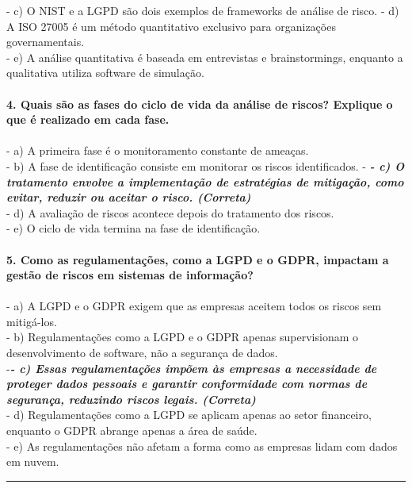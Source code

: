 \documentclass[12pt,oneside,a4paper,article]{abntex2}
\begin{document}
   - c) O NIST e a LGPD são dois exemplos de frameworks de análise de risco.
   - d) A ISO 27005 é um método quantitativo exclusivo para organizações governamentais.\\
   - e) A análise quantitativa é baseada em entrevistas e brainstormings, enquanto a qualitativa utiliza software de simulação.\\
\\
\textbf{4. Quais são as fases do ciclo de vida da análise de riscos? Explique o que é realizado em cada fase.}\\\\
   - a) A primeira fase é o monitoramento constante de ameaças.\\
   - b) A fase de identificação consiste em monitorar os riscos identificados. 
  -\textit{\textbf{ - c) O tratamento envolve a implementação de estratégias de mitigação, como evitar, reduzir ou aceitar o risco. (Correta)}}\\
   - d) A avaliação de riscos acontece depois do tratamento dos riscos.\\
   - e) O ciclo de vida termina na fase de identificação.\\
\\
\textbf{5. Como as regulamentações, como a LGPD e o GDPR, impactam a gestão de riscos em sistemas de informação?}\\\\
   - a) A LGPD e o GDPR exigem que as empresas aceitem todos os riscos sem mitigá-los.\\
   - b) Regulamentações como a LGPD e o GDPR apenas supervisionam o desenvolvimento de software, não a segurança de dados.\\
 -\textit{\textbf{- c) Essas regulamentações impõem às empresas a necessidade de proteger dados pessoais e garantir conformidade com normas de segurança, reduzindo riscos legais. (Correta)}}\\
   - d) Regulamentações como a LGPD se aplicam apenas ao setor financeiro, enquanto o GDPR abrange apenas a área de saúde.\\
   - e) As regulamentações não afetam a forma como as empresas lidam com dados em nuvem.\\

\par\noindent\rule{\textwidth}{0.4pt}
\end{document}
